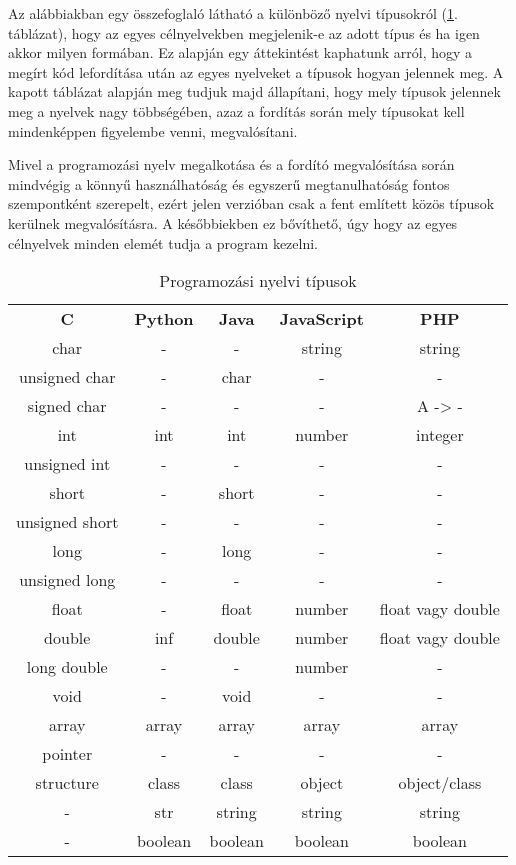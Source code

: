 
Az alábbiakban egy összefoglaló látható a különböző nyelvi típusokról (\ref{tab:lang_types}. táblázat), hogy az egyes célnyelvekben megjelenik-e az adott típus és ha igen akkor milyen formában. Ez alapján egy áttekintést kaphatunk arról, hogy a megírt kód lefordítása után az egyes nyelveket a típusok hogyan jelennek meg.
A kapott táblázat alapján meg tudjuk majd állapítani, hogy mely típusok jelennek meg a nyelvek nagy többségében, azaz a fordítás során mely típusokat kell mindenképpen figyelembe venni, megvalósítani.

Mivel a programozási nyelv megalkotása és a fordító megvalósítása során mindvégig a könnyű használhatóság és egyszerű megtanulhatóság fontos szempontként szerepelt, ezért jelen verzióban csak a fent említett közös típusok kerülnek megvalósításra. A későbbiekben ez bővíthető, úgy hogy az egyes célnyelvek minden elemét tudja a program kezelni.
\begin{table}
	\centering
	\begin{tabular}{c|c|c|c|c}
		\textbf{C} & \textbf{Python} & \textbf{Java} & \textbf{JavaScript} & \textbf{PHP}\\
		char & - & - & string & string \\
		unsigned char & - & char & - & - \\
		signed char & - & - & - & A -> - \\
		int & int & int & number & integer \\
		unsigned int & - & - & - & - \\
		short & - & short & - & - \\
		unsigned short & - & - & - & - \\
		long & - & long & - & - \\
		unsigned long & - & - & - & - \\
		float & - & float & number & float vagy double \\
		double & inf & double & number & float vagy double \\
		long double & - & - & number & - \\
		void & - & void & - & - \\
		array & array & array & array & array \\
		pointer & - & - & - & - \\
		structure & class & class & object & object/class \\
		- & str & string & string & string \\
		- & boolean & boolean & boolean & boolean \\
	\end{tabular}
	\caption{Programozási nyelvi típusok}
	\label{tab:lang_types}
\end{table}

